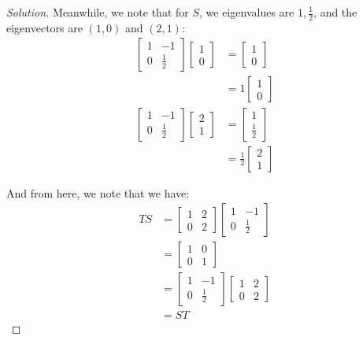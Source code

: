 \documentclass{article}
\newenvironment{solution}{\begin{proof}[Solution]}{\end{proof}}
\begin{document}
\begin{solution}
		Meanwhile, we note that for $S$, we eigenvalues are $1, \frac{1}{2}$, and the eigenvectors are $(1,0)$ and $(2,1)$:
		\begin{align*}
			\begin{bmatrix}
				1 & -1\\0&\frac{1}{2}
			\end{bmatrix}\begin{bmatrix}
			1 \\ 0
		\end{bmatrix} &= \begin{bmatrix}
		1 \\ 0
	\end{bmatrix} \\
&= 1 \begin{bmatrix}
	1 \\ 0
\end{bmatrix} \\
\begin{bmatrix}
	1 & -1\\0&\frac{1}{2}
\end{bmatrix}\begin{bmatrix}
	2 \\ 1
\end{bmatrix} &= \begin{bmatrix}
	1 \\ \frac{1}{2}
\end{bmatrix} \\
&= \frac{1}{2} \begin{bmatrix}
	2 \\ 1
\end{bmatrix}
		\end{align*}
	
	And from here, we note that we have:
	\begin{align*}
		TS &= \begin{bmatrix}
			1 & 2 \\ 0 & 2 
		\end{bmatrix} \begin{bmatrix}
		1 & -1 \\ 0 & \frac{1}{2}
	\end{bmatrix} \\
&= \begin{bmatrix}
	1 & 0 \\ 0 & 1
\end{bmatrix} \\
&= \begin{bmatrix}
	1 & - 1 \\ 0 & \frac{1}{2} 
\end{bmatrix}
\begin{bmatrix}
	1 & 2 \\ 0 & 2 
\end{bmatrix} \\
&= ST
	\end{align*}
	\end{solution}
\end{document}
